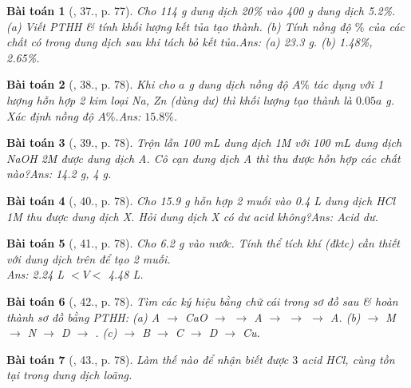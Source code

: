 \documentclass{article}
\newtheorem{baitoan}{Bài toán}
\begin{document}
\begin{baitoan}[\cite{An_Hoa_Hoc_nang_cao_8_9}, 37., p. 77]
	Cho {\rm114 g} dung dịch {\rm{} 20\%} vào {\rm400 g} dung dịch {\rm{} 5.2\%}. (a) Viết {\rm PTHH} \& tính khối lượng kết tủa tạo thành. (b) Tính nồng độ $\%$ của các chất có trong dung dịch sau khi tách bỏ kết tủa.\hfill{\sf Ans: (a) 23.3 g. (b) 1.48\%, 2.65\%.}
\end{baitoan}

\begin{baitoan}[\cite{An_Hoa_Hoc_nang_cao_8_9}, 38., p. 78]
	Khi cho $a$ {\rm g} dung dịch {\rm {}} nồng độ $A\%$ tác dụng với 1 lượng hỗn hợp 2 kim loại {\rm Na, Zn} (dùng dư) thì khối lượng {\rm {}} tạo thành là $0.05a$ {\rm g}. Xác định nồng độ $A\%$.\hfill{\sf Ans: $15.8\%$.}
\end{baitoan}

\begin{baitoan}[\cite{An_Hoa_Hoc_nang_cao_8_9}, 39., p. 78]
	Trộn lẫn {\rm100 mL} dung dịch {\rm{} 1M} với {\rm100 mL} dung dịch {\rm NaOH 2M} được dung dịch A. Cô cạn dung dịch A thì thu được hỗn hợp các chất nào?\hfill{\sf Ans: 14.2 g, 4 g.}
\end{baitoan}

\begin{baitoan}[\cite{An_Hoa_Hoc_nang_cao_8_9}, 40., p. 78]
	Cho {\rm15.9 g} hỗn hợp 2 muối {\rm{}} vào {\rm0.4 L} dung dịch {\rm HCl 1M} thu được dung dịch X. Hỏi dung dịch X có dư acid không?\hfill{\sf Ans: Acid dư.}
\end{baitoan}

\begin{baitoan}[\cite{An_Hoa_Hoc_nang_cao_8_9}, 41., p. 78]
	Cho {\rm6.2 g } vào nước. Tính thể tích khí {\rm{}} (đktc) cần thiết với dung dịch trên để tạo 2 muối.\\\mbox{}\hfill{\sf Ans: 2.24 L $< V <$ 4.48 L.}
\end{baitoan}

\begin{baitoan}[\cite{An_Hoa_Hoc_nang_cao_8_9}, 42., p. 78]
	Tìm các ký hiệu bằng chữ cái trong sơ đồ sau \& hoàn thành sơ đồ bằng {\rm PTHH}: (a) {\rm A $\to$ CaO $\to$  $\to$ A $\to$  $\to$  $\to$ A}. (b) {\rm{} $\to$ M $\to$ N $\to$ D $\to$ }. (c) {\rm{} $\to$ B $\to$ C $\to$ D $\to$ Cu}.
\end{baitoan}

\begin{baitoan}[\cite{An_Hoa_Hoc_nang_cao_8_9}, 43., p. 78]
	Làm thế nào để nhận biết được $3$ acid {\rm HCl, } cùng tồn tại trong dung dịch loãng.	
\end{baitoan}
\end{document}
